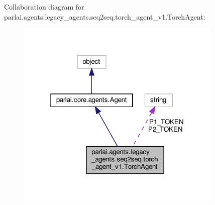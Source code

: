 Collaboration diagram for parlai.\+agents.\+legacy\+\_\+agents.\+seq2seq.\+torch\+\_\+agent\+\_\+v1.\+Torch\+Agent\+:
\nopagebreak
\begin{figure}[H]
\begin{center}
\leavevmode
\includegraphics[width=279pt]{d2/da6/classparlai_1_1agents_1_1legacy__agents_1_1seq2seq_1_1torch__agent__v1_1_1TorchAgent__coll__graph}
\end{center}
\end{figure}
